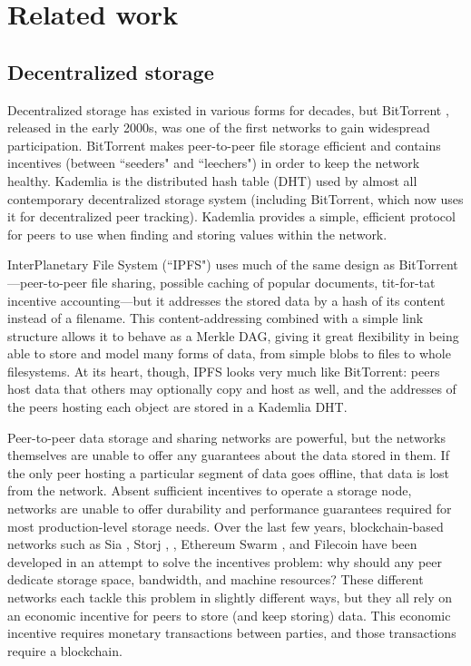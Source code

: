 \documentclass[10pt]{article}
\begin{document}
\section{Related work}
\label{sec:related}

\subsection{Decentralized storage}

Decentralized storage has existed in various forms for decades, but BitTorrent \cite{bittorrent-protocol,bittorrent-review}, released in the early 2000s, was one of the first networks to gain widespread participation. BitTorrent makes peer-to-peer file storage efficient and contains incentives (between ``seeders" and ``leechers") in order to keep the network healthy. Kademlia \cite{kademlia} is the distributed hash table (DHT) used by almost all contemporary decentralized storage system (including BitTorrent, which now uses it for decentralized peer tracking). Kademlia provides a simple, efficient protocol for peers to use when finding and storing values within the network.

InterPlanetary File System (``IPFS") \cite{ipfs} uses much of the same design as BitTorrent---peer-to-peer file sharing, possible caching of popular documents, tit-for-tat incentive accounting---but it addresses the stored data by a hash of its content instead of a filename. This content-addressing combined with a simple link structure allows it to behave as a Merkle DAG, giving it great flexibility in being able to store and model many forms of data, from simple blobs to files to whole filesystems. At its heart, though, IPFS looks very much like BitTorrent: peers host data that others may optionally copy and host as well, and the addresses of the peers hosting each object are stored in a Kademlia DHT.

Peer-to-peer data storage and sharing networks are powerful, but the networks themselves are unable to offer any guarantees about the data stored in them. If the only peer hosting a particular segment of data goes offline, that data is lost from the network. Absent sufficient incentives to operate a storage node, networks are unable to offer durability and performance guarantees required for most production-level storage needs. Over the last few years, blockchain-based networks such as Sia \cite{sia}, Storj \cite{storj}, \cite{bigchaindb,bigchaindb2}, Ethereum Swarm \cite{swarm1,swarm2}, and Filecoin \cite{filecoin} have been developed in an attempt to solve the incentives problem: why should any peer dedicate storage space, bandwidth, and machine resources? These different networks each tackle this problem in slightly different ways, but they all rely on an economic incentive for peers to store (and keep storing) data. This economic incentive requires monetary transactions between parties, and those transactions require a blockchain. 
\end{document}
